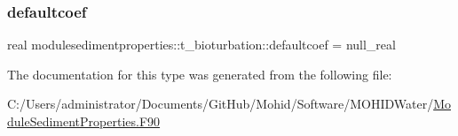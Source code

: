 \mbox{\label{structmodulesedimentproperties_1_1t__bioturbation_a08f9261f05b0e9ba1919884f135b78d1}} 
\subsubsection{\texorpdfstring{defaultcoef}{defaultcoef}}
{\footnotesize\ttfamily real modulesedimentproperties\+::t\+\_\+bioturbation\+::defaultcoef = null\+\_\+real\hspace{0.3cm}{\ttfamily [private]}}



The documentation for this type was generated from the following file\+:\begin{DoxyCompactItemize}
\item 
C\+:/\+Users/administrator/\+Documents/\+Git\+Hub/\+Mohid/\+Software/\+M\+O\+H\+I\+D\+Water/\mbox{\hyperlink{_module_sediment_properties_8_f90}{Module\+Sediment\+Properties.\+F90}}\end{DoxyCompactItemize}
